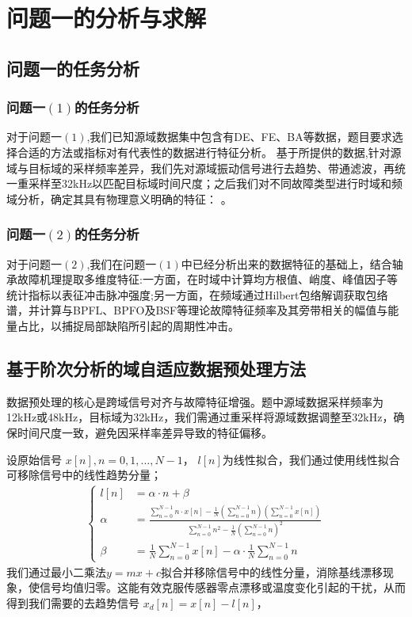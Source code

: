 \documentclass[a4paper]{CPIPC}
\numberwithin{equation}{section}
\begin{document}
\section{问题一的分析与求解}
\subsection{问题一的任务分析}
 \subsubsection{问题一$(1)$的任务分析}
 对于问题一$(1)$,我们已知源域数据集中包含有DE、FE、BA等数据，题目要求选择合适的方法或指标对有代表性的数据进行特征分析。
 基于所提供的数据,针对源域与目标域的采样频率差异，我们先对源域振动信号进行去趋势、带通滤波，再统一重采样至32kHz以匹配目标域时间尺度；之后我们对不同故障类型进行时域和频域分析，确定其具有物理意义明确的特征： 。

 \subsubsection{问题一$(2)$的任务分析}
 对于问题一$(2)$,我们在问题一$(1)$中已经分析出来的数据特征的基础上，结合轴承故障机理提取多维度特征:一方面，在时域中计算均方根值、峭度、峰值因子等统计指标以表征冲击脉冲强度;另一方面，在频域通过Hilbert包络解调获取包络谱，并计算与BPFL、BPFO及BSF等理论故障特征频率及其旁带相关的幅值与能量占比，以捕捉局部缺陷所引起的周期性冲击。
 
\subsection{基于阶次分析的域自适应数据预处理方法}

数据预处理的核心是跨域信号对齐与故障特征增强。题中源域数据采样频率为12kHz或48kHz，目标域为32kHz，我们需通过重采样将源域数据调整至32kHz，确保时间尺度一致，避免因采样率差异导致的特征偏移。

设原始信号  
$x[n], n = 0, 1, \dots, N - 1$，
$l[n]$为线性拟合，我们通过使用线性拟合可移除信号中的线性趋势分量；
\begin{align}
    \left\{
    \begin{aligned}
    l[n] &= \alpha \cdot n + \beta\\
    \alpha &= \frac{\sum_{n=0}^{N-1} n \cdot x[n] - \frac{1}{N} \left( \sum_{n=0}^{N-1} n \right) \left( \sum_{n=0}^{N-1} x[n] \right)}{\sum_{n=0}^{N-1} n^2 - \frac{1}{N} \left( \sum_{n=0}^{N-1} n \right)^2}\\
    \beta &= \frac{1}{N} \sum_{n=0}^{N-1} x[n] - \alpha \cdot \frac{1}{N} \sum_{n=0}^{N-1} n
   \end{aligned} 
    \right.
\end{align}
我们通过最小二乘法$ y = mx + c $拟合并移除信号中的线性分量，消除基线漂移现象，使信号均值归零。这能有效克服传感器零点漂移或温度变化引起的干扰，从而得到我们需要的去趋势信号  $x_d[n] = x[n] - l[n]$，
\end{document}
